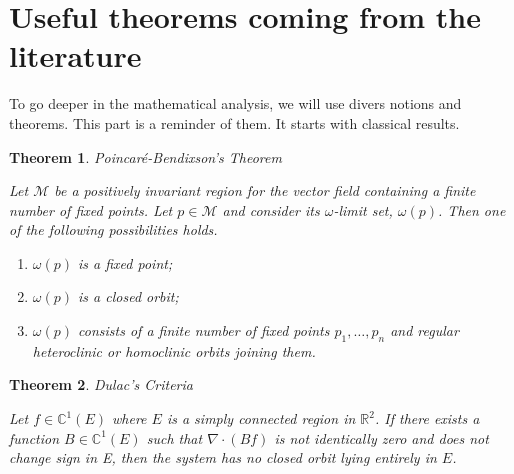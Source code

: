 \documentclass{article}
\newtheorem{theorem}{Theorem}
\begin{document}
\section{Useful theorems coming from the literature}
To go deeper in the mathematical analysis, we will use divers notions and theorems. This part is a reminder of them. It starts with classical results.

\begin{theorem} Poincaré-Bendixson's Theorem \label{theorem:Poincaré-Bendixson} \cite{wiggins_introduction_2003}



Let $\mathcal{M}$ be a positively invariant region for the vector field containing a finite number of fixed points. Let $p \in \mathcal{M}$ and consider its $\omega$-limit set, $\omega(p)$. Then one of the following possibilities holds.
\begin{enumerate}
\item $\omega(p)$ is a fixed point;
\item $\omega(p)$ is a closed orbit;
\item $\omega(p)$ consists of a finite number of fixed points $p_1, \ldots, p_n$ and regular heteroclinic or homoclinic orbits joining them.
\end{enumerate}
\end{theorem}

\begin{theorem} Dulac's Criteria \cite{perko_differential_1996} \label{theorem:Dulac}

Let $f \in \mathbb{C}^1(E)$ where $E$ is a simply
connected region in $\mathbb R ^2$. If there exists a function $B \in \mathbb{C}^1(E)$ such that $\nabla \cdot (Bf)$ is not identically zero and does not change sign in E, then the system has no closed orbit lying entirely in $E$.
\end{theorem}
\end{document}
